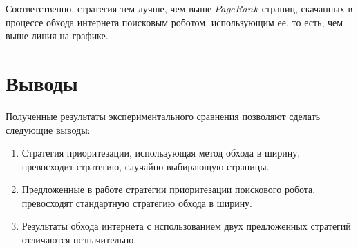 Соответственно, стратегия тем лучше, чем выше $PageRank$ страниц, скачанных в процессе обхода интернета поисковым роботом, использующим ее, то есть, чем выше линия на графике.

\section{Выводы}

Полученные результаты экспериментального сравнения позволяют сделать следующие выводы:

\begin{enumerate}
\item Стратегия приоритезации, использующая метод обхода в ширину, превосходит стратегию, случайно выбирающую страницы.
\item Предложенные в работе стратегии приоритезации поискового робота, превосходят стандартную стратегию обхода в ширину.
\item Результаты обхода интернета с использованием двух предложенных стратегий отличаются незначительно.
\end{enumerate}